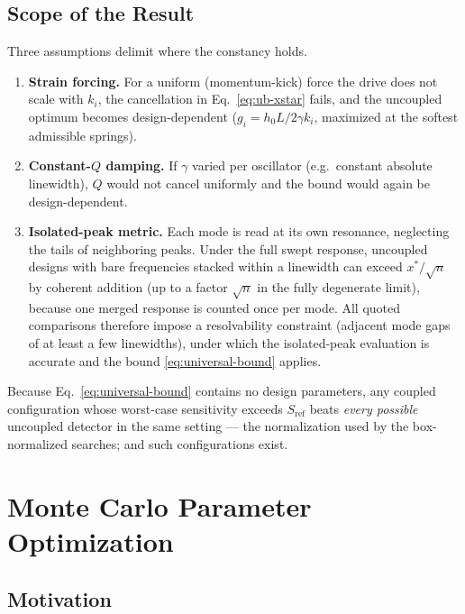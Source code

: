 \documentclass[11pt, letterpaper]{article}
\newcommand{\refsys}{\mathrm{ref}}
\begin{document}
\subsection{Scope of the Result}

Three assumptions delimit where the constancy holds.
\begin{enumerate}[noitemsep]
  \item \textbf{Strain forcing.}  For a uniform (momentum-kick) force
        the drive does not scale with $k_i$, the cancellation in
        Eq.~\eqref{eq:ub-xstar} fails, and the uncoupled optimum
        becomes design-dependent ($g_i = h_0 L / 2\gamma k_i$, maximized
        at the softest admissible springs).
  \item \textbf{Constant-$Q$ damping.}  If $\gamma$ varied per
        oscillator (e.g.\ constant absolute linewidth), $Q$ would not
        cancel uniformly and the bound would again be design-dependent.
  \item \textbf{Isolated-peak metric.}  Each mode is read at its own
        resonance, neglecting the tails of neighboring peaks.  Under the
        full swept response, uncoupled designs with bare frequencies
        stacked within a linewidth can exceed $x^{*}/\sqrt{n}$ by
        coherent addition (up to a factor $\sqrt{n}$ in the fully
        degenerate limit), because one merged response is counted once
        per mode.  All quoted comparisons therefore impose a
        resolvability constraint (adjacent mode gaps of at least a few
        linewidths), under which the isolated-peak evaluation is
        accurate and the bound \eqref{eq:universal-bound} applies.
\end{enumerate}

Because Eq.~\eqref{eq:universal-bound} contains no design parameters,
any coupled configuration whose worst-case sensitivity exceeds
$S_{\refsys}$ beats \emph{every possible} uncoupled detector in the
same setting --- the normalization used by the box-normalized searches;
and such configurations exist.

\section{Monte Carlo Parameter Optimization}

\subsection{Motivation}
\end{document}
